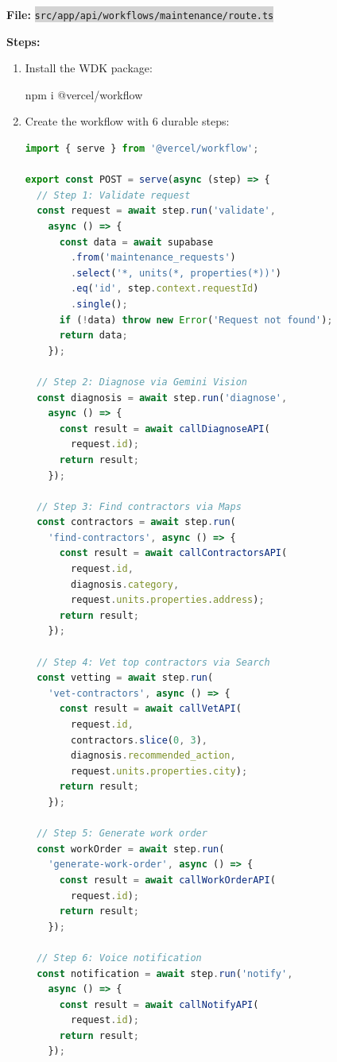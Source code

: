 \documentclass[11pt, a4paper]{article}
\newcommand{\code}[1]{\texttt{\small\colorbox{lightgray}{#1}}}
\begin{document}
\vspace{0.3em}

\textbf{File:} \code{src/app/api/workflows/maintenance/route.ts}

\textbf{Steps:}
\begin{enumerate}[leftmargin=2em, itemsep=2pt]
  \item Install the WDK package:
    \begin{codebox}
npm i @vercel/workflow
    \end{codebox}

  \item Create the workflow with 6 durable steps:
\begin{lstlisting}[language=JavaScript]
import { serve } from '@vercel/workflow';

export const POST = serve(async (step) => {
  // Step 1: Validate request
  const request = await step.run('validate', 
    async () => {
      const data = await supabase
        .from('maintenance_requests')
        .select('*, units(*, properties(*))')
        .eq('id', step.context.requestId)
        .single();
      if (!data) throw new Error('Request not found');
      return data;
    });

  // Step 2: Diagnose via Gemini Vision
  const diagnosis = await step.run('diagnose', 
    async () => {
      const result = await callDiagnoseAPI(
        request.id);
      return result;
    });

  // Step 3: Find contractors via Maps
  const contractors = await step.run(
    'find-contractors', async () => {
      const result = await callContractorsAPI(
        request.id, 
        diagnosis.category,
        request.units.properties.address);
      return result;
    });

  // Step 4: Vet top contractors via Search
  const vetting = await step.run(
    'vet-contractors', async () => {
      const result = await callVetAPI(
        request.id,
        contractors.slice(0, 3),
        diagnosis.recommended_action,
        request.units.properties.city);
      return result;
    });

  // Step 5: Generate work order
  const workOrder = await step.run(
    'generate-work-order', async () => {
      const result = await callWorkOrderAPI(
        request.id);
      return result;
    });

  // Step 6: Voice notification
  const notification = await step.run('notify', 
    async () => {
      const result = await callNotifyAPI(
        request.id);
      return result;
    });


\end{lstlisting}
\end{enumerate}
\end{document}

